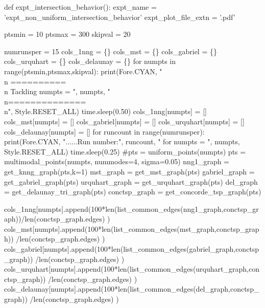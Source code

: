 

\nwenddocs{}\plusendmoddef\nwstartdeflinemarkup{}\nwenddeflinemarkup
def expt_intersection_behavior():
     expt_name           = 'expt_non_uniform_intersection_behavior'
     expt_plot_file_extn = '.pdf'

     ptsmin   = 10
     ptsmax   = 300
     skipval  = 20

     numrunsper    = 15
     cols_1nng     = \{\}
     cols_mst      = \{\}
     cols_gabriel  = \{\}
     cols_urquhart = \{\}
     cols_delaunay = \{\}
     for numpts in range(ptsmin,ptsmax,skipval):
          print(Fore.CYAN, "\\n ========== \\n Tackling numpts = ", numpts, "\\n==============\\n", Style.RESET_ALL)
          time.sleep(0.50)
          cols_1nng[numpts]     = []
          cols_mst[numpts]      = []
          cols_gabriel[numpts]      = []
          cols_urquhart[numpts]      = []
          cols_delaunay[numpts] = []
          for runcount in range(numrunsper):
               print(Fore.CYAN, "......Run number:", runcount, " for numpts = ", numpts, Style.RESET_ALL)
               time.sleep(0.25)
               #pts            = uniform_points(numpts)
               pts            = multimodal_points(numpts, nummodes=4, sigma=0.05)     
               nng1_graph     = get_knng_graph(pts,k=1)
               mst_graph      = get_mst_graph(pts)
               gabriel_graph  = get_gabriel_graph(pts)
               urquhart_graph = get_urquhart_graph(pts)
               del_graph     = get_delaunay_tri_graph(pts)
               conctsp_graph = get_concorde_tsp_graph(pts)
               
               cols_1nng[numpts].append(100*len(list_common_edges(nng1_graph,conctsp_graph))/len(conctsp_graph.edges) )
               cols_mst[numpts].append(100*len(list_common_edges(mst_graph,conctsp_graph)) /len(conctsp_graph.edges) )
               cols_gabriel[numpts].append(100*len(list_common_edges(gabriel_graph,conctsp_graph)) /len(conctsp_graph.edges) )
               cols_urquhart[numpts].append(100*len(list_common_edges(urquhart_graph,conctsp_graph)) /len(conctsp_graph.edges) )
               cols_delaunay[numpts].append(100*len(list_common_edges(del_graph,conctsp_graph)) /len(conctsp_graph.edges) )

